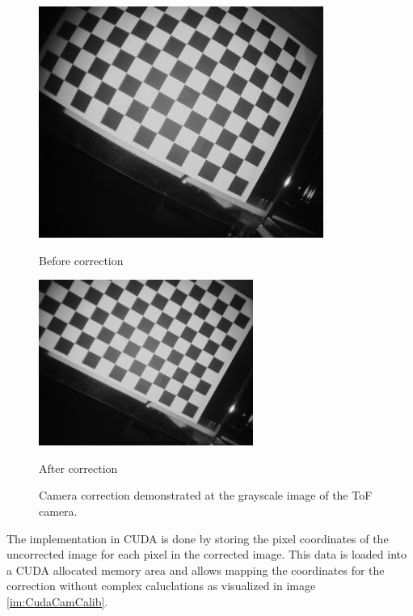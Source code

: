 \begin{figure}[H]
    \centering
    \begin{minipage}[b]{0.45\textwidth}
      \includegraphics[scale=0.70]{images/camcalib_source.jpg}
      \caption{Before correction}
      \label{fig:camCalibBefore} 
    \end{minipage} %
    \begin{minipage}[b]{0.45\textwidth}
      \includegraphics[scale=0.70]{images/camcalib_result.png} 
      \caption{After correction}
      \label{fig:camCalibAfter} 
    \end{minipage}
    \caption{Camera correction demonstrated at the grayscale image of the ToF camera.}
    \label{fig.camCalib}
  \end{figure}
The implementation in CUDA is done by storing the pixel coordinates of the uncorrected image for each pixel in the corrected image. This data is loaded into a CUDA allocated memory area and allows mapping the coordinates for the correction without complex caluclations as visualized in image \ref{im:CudaCamCalib}.
